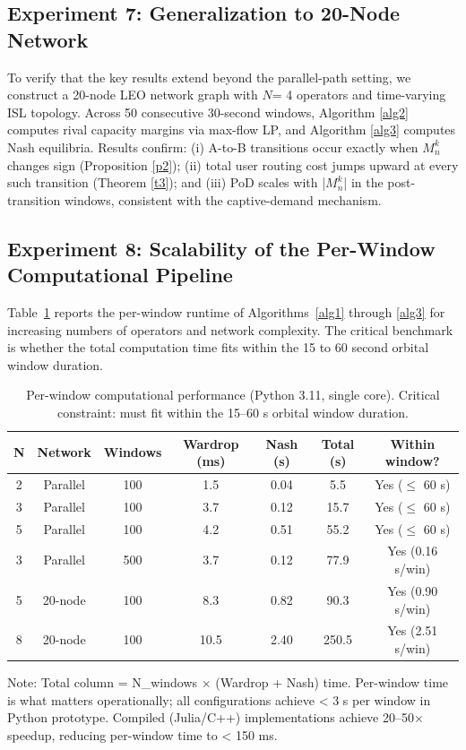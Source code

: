 \documentclass[review,3p,authoryear]{elsarticle}
\begin{document}
\subsection{Experiment 7: Generalization to 20-Node Network}
\label{sec6.7}

To verify that the key results extend beyond the parallel-path setting, we construct a 20-node LEO network graph with $N$= 4 operators and time-varying ISL topology. Across 50 consecutive 30-second windows, Algorithm \ref{alg2} computes rival capacity margins via max-flow LP, and Algorithm \ref{alg3} computes Nash equilibria. Results confirm: (i) A-to-B transitions occur exactly when $M_{n}^{k}$ changes sign (Proposition \ref{p2}); (ii) total user routing cost jumps upward at every such transition (Theorem \ref{t3}); and (iii) PoD scales with |$M_{n}^{k}$| in the post-transition windows, consistent with the captive-demand mechanism.

\subsection{Experiment 8: Scalability of the Per-Window Computational Pipeline}
\label{sec6.8}

Table~\ref{tab:7} reports the per-window runtime of Algorithms~\ref{alg1} through \ref{alg3} for increasing numbers of operators and network complexity. The critical benchmark is whether the total computation time fits within the 15 to 60 second orbital window duration.

\begin{table}[!ht]
\centering
\caption{Per-window computational performance (Python 3.11, single core). Critical constraint: must fit within the 15--60 s orbital window duration.}
\label{tab:7}
\begin{tabular}{@{}ccccccc@{}}
\toprule
\textbf{N} & \textbf{Network} & \textbf{Windows} & \textbf{Wardrop (ms)} & \textbf{Nash (s)} & \textbf{Total (s)} & \textbf{Within window?} \\ \midrule
2 & Parallel & 100 & 1.5 & 0.04 & 5.5 & Yes ($\le$ 60 s) \\
3 & Parallel & 100 & 3.7 & 0.12 & 15.7 & Yes ($\le$ 60 s) \\
5 & Parallel & 100 & 4.2 & 0.51 & 55.2 & Yes ($\le$ 60 s) \\
3 & Parallel & 500 & 3.7 & 0.12 & 77.9 & Yes (0.16 s/win) \\
5 & 20-node & 100 & 8.3 & 0.82 & 90.3 & Yes (0.90 s/win) \\
8 & 20-node & 100 & 10.5 & 2.40 & 250.5 & Yes (2.51 s/win) \\ \bottomrule
\end{tabular}
\end{table}
Note: Total column = N\_windows \ensuremath{\times} (Wardrop + Nash) time. Per-window time is what matters operationally; all configurations achieve < 3 s per window in Python prototype. Compiled (Julia/C++) implementations achieve 20--50\ensuremath{\times} speedup, reducing per-window time to < 150 ms.
\end{document}
